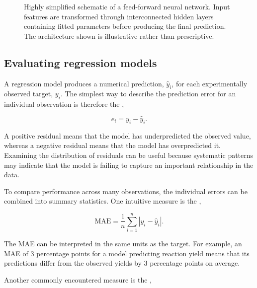 \begin{figure}[htbp]
{%
    }

    \caption{
        Highly simplified schematic of a feed-forward neural network.
        Input features are transformed through interconnected hidden layers
        containing fitted parameters before producing the final prediction.
        The architecture shown is illustrative rather than prescriptive.
    }
    \label{fig2-8:neural-network}
\end{figure}

\subsection{Evaluating regression models}

A regression model produces a numerical prediction, \(\hat{y}_i\), for each experimentally observed target, \(y_i\).
The simplest way to describe the prediction error for an individual observation is therefore the ,

\begin{equation}
  e_i = y_i - \hat{y}_i.
\end{equation}

A positive residual means that the model has underpredicted the observed value, whereas a negative residual means that the model has overpredicted it.
Examining the distribution of residuals can be useful because systematic patterns may indicate that the model is failing to capture an important relationship in the data.

To compare performance across many observations, the individual errors can be combined into summary statistics.
One intuitive measure is the ,

\begin{equation}
  \mathrm{MAE} = \frac{1}{n} \sum_{i=1}^{n} \left| y_i - \hat{y}_i \right|.
\end{equation}

The MAE can be interpreted in the same units as the target.
For example, an MAE of \(3\) percentage points for a model predicting reaction yield means that its predictions differ from the observed yields by \(3\) percentage points on average.

Another commonly encountered measure is the ,

